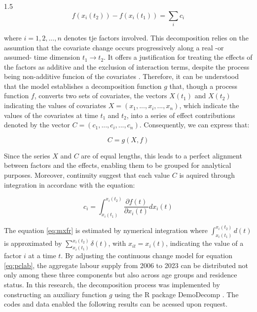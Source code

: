 \documentclass{article}
\begin{document}
\begin{spacing}{1.5}
  \begin{equation} \label{eq:hofr}
    f(x_i(t_2)) - f(x_i(t_1)) = \displaystyle\sum_{i}c_{i}
  \end{equation}

  \vspace{0.7em}\par

where  \(i = 1, 2, ..., n\) denotes tje factors involved. This decomposition relies on the assumtion that the covariate change occurs progressively along a real -or assumed- time dimension  \(t_1 \rightarrow t_2\). It offers a justification for treating the effects of the factors as additive and the exclusion of interaction terms, despite the process being non-additive funcion of the covariates \parencite[p.~786]{horiuchiDecompositionMethodBased2008}. Therefore, it can be understood that the model establishes a decomposition function \(g\) that, though a process function \(f\), converts two sets of covariates, the vectors \(X(t_1)\) and \(X(t_2)\) indicating the values of covariates \(X = (x_1, ..., x_i, ..., x_n)\), which indicate the values of the covariates at time \(t_1\) and \(t_2\), into a series of effect contributions denoted by the vector \(C = (c_1, ..., c_i, ..., c_n)\). Consequently, we can express that:
  
  \begin{equation}\label{eq:gfr}
    C = g(X, f)
  \end{equation}


  Since the series \(X\) and \(C\)  are of equal lengths, this leads to a perfect alignment between factors and the effects, enabling them to be grouped for analytical purposes. Moreover, continuity suggest that each value  \(C\) is aquired through integration in accordanc with the equation: 
  
  \begin{equation}\label{eq:mxfr}
    c_i = \int_{x_i(t_1)}^{x_i(t_2)} \frac{\partial f(t)}{\partial x_i(t)} dx_i(t)
  \end{equation}


  The equation \eqref{eq:mxfr} is estimated by nymerical integration where \(\int_{x_i(t_1)}^{x_i(t_2)} d(t)\)  is approximated by \(\sum_{x_i(t_1)}^{x_i(t_2)} \delta(t)\), with \(x_{it} = x_i(t)\), indicating the value of a factor \(i\) at a time \(t\). By adjusting the continuous change model for equation  \eqref{eq:pclab}, the aggregate labour supply from 2006 to 2023 can be distributed not only among these three components but also across age groups and residence status. In this research, the decomposition process was implemented by constructing an auxiliary function \(g\) using the R package \parencite{Rstat:2018} DemoDecomp \parencite{DemoDecomp:2018}. The codes and data enabled the following results can be acessed upon request. 
  

\end{spacing}
\end{document}
